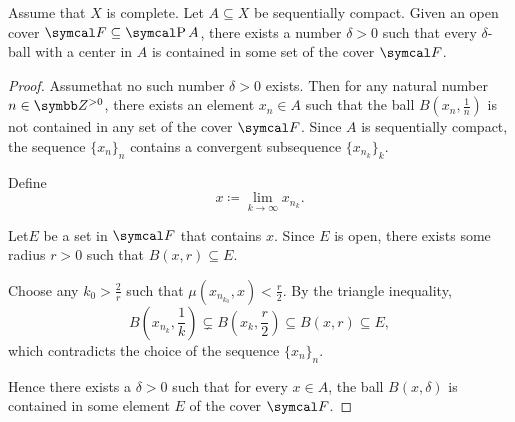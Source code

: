 \begin{lemma}\label{thm:lebesgue_covering_lemma}
  Assume that \( X \) is complete. Let \( A \subseteq X \) be sequentially compact. Given an open cover \( \Cal{F} \subseteq \Power A \), there exists a number \( \delta > 0 \) such that every \( \delta \)-ball with a center in \( A \) is contained in some set of the cover \( \Cal{F} \).
\end{lemma}
\begin{proof}
  Assume\LEM that no such number \( \delta > 0 \) exists. Then for any natural number \( n \in \Z^{>0} \), there exists an element \( x_n \in A \) such that the ball \( B(x_n, \frac 1 n) \) is not contained in any set of the cover \( \Cal{F} \). Since \( A \) is sequentially compact, the sequence \( \{ x_n \}_n \) contains a convergent subsequence \( \{ x_{n_k} \}_k \).

  Define
  \begin{equation*}
    x \coloneqq \lim_{k \to \infty} x_{n_k}.
  \end{equation*}

  Let\AOC \( E \) be a set in \( \Cal{F} \) that contains \( x \). Since \( E \) is open, there exists some radius \( r > 0 \) such that \( B(x, r) \subseteq E \).

  Choose any \( k_0 > \frac 2 r \) such that \( \mu(x_{n_{k_0}}, x) < \frac r 2 \). By the triangle inequality,
  \begin{equation*}
    B \left(x_{n_k}, \frac 1 k \right) \subsetneq B \left(x_k, \frac r 2 \right) \subseteq B(x, r) \subseteq E,
  \end{equation*}
  which contradicts the choice of the sequence \( \{ x_n \}_n \).

  Hence there exists a \( \delta > 0 \) such that for every \( x \in A \), the ball \( B(x, \delta) \) is contained in some element \( E \) of the cover \( \Cal{F} \).
\end{proof}

